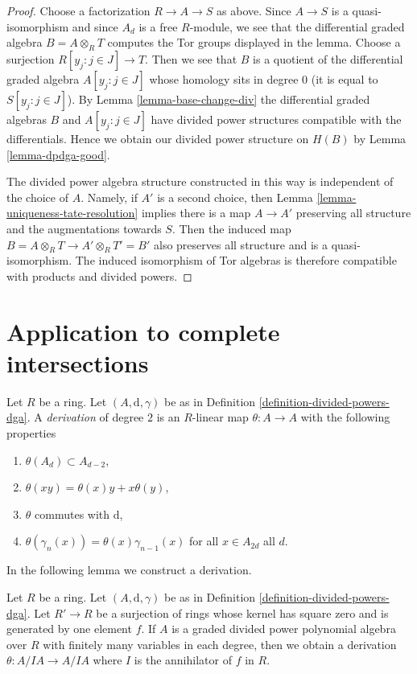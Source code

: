 \begin{proof}
Choose a factorization $R \to A \to S$ as above. Since $A \to S$
is a quasi-isomorphism and since $A_d$ is a free $R$-module,
we see that the differential graded algebra $B = A \otimes_R T$ computes
the Tor groups displayed in the lemma. Choose a surjection
$R[y_j:j\in J] \to T$. Then we see that
$B$ is a quotient of the differential graded algebra
$A[y_j:j\in J]$ whose homology sits in degree $0$ (it is equal
to $S[y_j:j\in J]$).
By Lemma \ref{lemma-base-change-div} the differential graded algebras $B$ and
$A[y_j:j\in J]$ have divided power structures compatible
with the differentials. Hence we obtain our divided
power structure on $H(B)$ by Lemma \ref{lemma-dpdga-good}.

\medskip\noindent
The divided power algebra structure constructed in this way is independent
of the choice of $A$. Namely, if $A'$ is a second choice, then
Lemma \ref{lemma-uniqueness-tate-resolution}
implies there is a map $A \to A'$ preserving all structure and the
augmentations towards $S$. Then the induced map
$B = A \otimes_R T \to A' \otimes_R T' = B'$ also preserves
all structure
and is a quasi-isomorphism. The induced isomorphism of
Tor algebras is therefore compatible with products
and divided powers.
\end{proof}





\section{Application to complete intersections}
\label{section-application-ci}

\noindent
Let $R$ be a ring. Let $(A, \text{d}, \gamma)$ be as in
Definition \ref{definition-divided-powers-dga}.
A {\it derivation} of degree $2$ is an $R$-linear
map $\theta : A \to A$ with the following
properties
\begin{enumerate}
\item $\theta(A_d) \subset A_{d - 2}$,
\item $\theta(xy) = \theta(x)y + x\theta(y)$,
\item $\theta$ commutes with $\text{d}$,
\item $\theta(\gamma_n(x)) = \theta(x) \gamma_{n - 1}(x)$
for all $x \in A_{2d}$ all $d$.
\end{enumerate}
In the following lemma we construct a derivation.

\begin{lemma}
\label{lemma-get-derivation}
Let $R$ be a ring. Let $(A, \text{d}, \gamma)$ be as in
Definition \ref{definition-divided-powers-dga}.
Let $R' \to R$ be a surjection of rings whose kernel
has square zero and is generated by one element $f$.
If $A$ is a graded divided power polynomial algebra over $R$
with finitely many variables in each degree,
then we obtain a derivation
$\theta : A/IA \to A/IA$ where $I$ is the annihilator
of $f$ in $R$.
\end{lemma}

